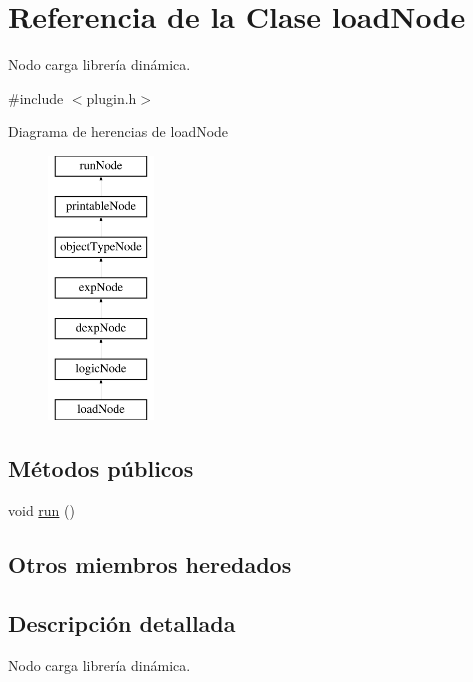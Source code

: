 \hypertarget{classloadNode}{\section{Referencia de la Clase load\-Node}
\label{classloadNode}
}


Nodo carga librería dinámica.  




{\ttfamily \#include $<$plugin.\-h$>$}

Diagrama de herencias de load\-Node\begin{figure}[H]
\begin{center}
\leavevmode
\includegraphics[height=7.000000cm]{classloadNode}
\end{center}
\end{figure}
\subsection*{Métodos públicos}
\begin{DoxyCompactItemize}
\item 
void \hyperlink{classloadNode_a27a4b249f01174cd93f0c386822a4f95}{run} ()
\end{DoxyCompactItemize}
\subsection*{Otros miembros heredados}


\subsection{Descripción detallada}
Nodo carga librería dinámica. 

